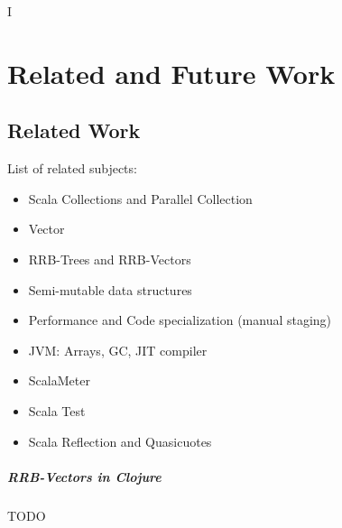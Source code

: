 I%

\chapter{Related and Future Work} %

\label{RelatedWork} %


\section{Related Work}

List of related subjects:
\begin{itemize}
  \item Scala Collections and Parallel Collection
  \item Vector
  \item RRB-Trees and RRB-Vectors
  \item Semi-mutable data structures
  \item Performance and Code specialization (manual staging)
  \item JVM: Arrays, GC, JIT compiler
  \item ScalaMeter
  \item Scala Test
  \item Scala Reflection and Quasicuotes
\end{itemize}

\paragraph{RRB-Vectors in Clojure}



\color{red} TODO \color{black}




